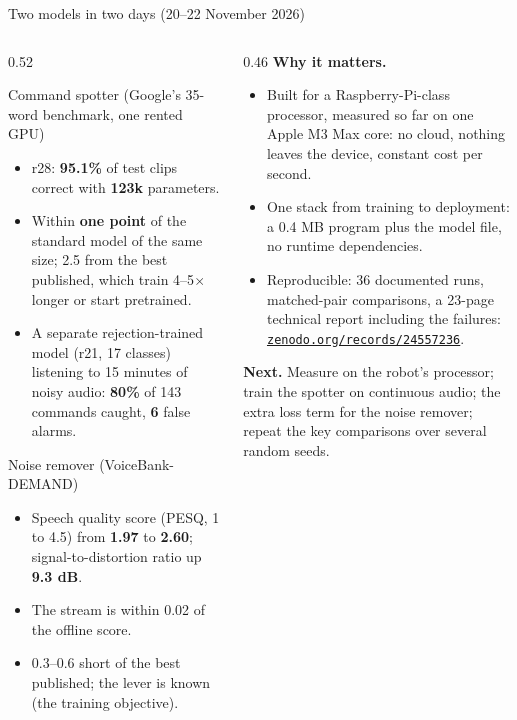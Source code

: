 \documentclass[aspectratio=169,10pt]{beamer}
\newcommand{\num}[1]{\textcolor{accent}{\textbf{#1}}}
\begin{document}
\begin{frame}{Two models in two days (20--22 November 2026)}
\small
\begin{columns}[T]
\begin{column}{0.52\textwidth}
\begin{block}{Command spotter (Google's 35-word benchmark, one rented GPU)}
\scriptsize
\begin{itemize}
\item r28: \num{95.1\%} of test clips correct with \num{123k} parameters.
\item Within \num{one point} of the standard model of the same size; 2.5 from the best published, which train 4--5$\times$ longer or start pretrained.
\item A separate rejection-trained model (r21, 17 classes) listening to 15 minutes of noisy audio: \num{80\%} of 143 commands caught, \num{6} false alarms.
\end{itemize}
\end{block}
\begin{block}{Noise remover (VoiceBank-DEMAND)}
\scriptsize
\begin{itemize}
\item Speech quality score (PESQ, 1 to 4.5) from \num{1.97} to \num{2.60}; signal-to-distortion ratio up \num{9.3 dB}.
\item The stream is within 0.02 of the offline score.
\item 0.3--0.6 short of the best published; the lever is known (the training objective).
\end{itemize}
\end{block}
\end{column}
\begin{column}{0.46\textwidth}
\textbf{Why it matters.}
\begin{itemize}
\item Built for a Raspberry-Pi-class processor, measured so far on one Apple M3 Max core: no cloud, nothing leaves the device, constant cost per second.
\item One stack from training to deployment: a 0.4 MB program plus the model file, no runtime dependencies.
\item Reproducible: 36 documented runs, matched-pair comparisons, a 23-page technical report including the failures: \href{https://zenodo.org/records/24557236}{\texttt{zenodo.org/records/24557236}}.
\end{itemize}
\medskip
\textbf{Next.} Measure on the robot's processor; train the spotter on continuous audio; the extra loss term for the noise remover; repeat the key comparisons over several random seeds.
\end{column}
\end{columns}
\end{frame}
\end{document}
